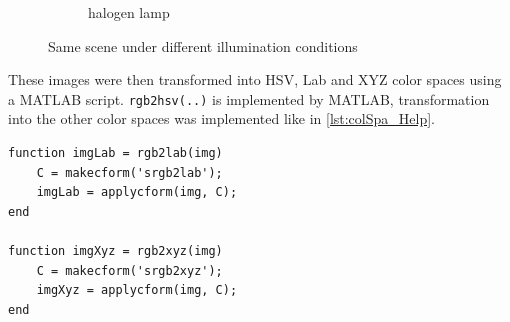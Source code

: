 \documentclass[
a4paper,     %
11pt         %
]{scrartcl}  %
\begin{document}
\begin{figure}[ht!]
\begin{subfigure}{.3\textwidth}
  \caption{halogen lamp}
\end{subfigure}
\caption{Same scene under different illumination conditions}
\label{fig:colSpa1}
\end{figure}

These images were then transformed into HSV, Lab and XYZ color spaces using a MATLAB script. \lstinline{rgb2hsv(..)} is implemented by MATLAB, transformation into the other color spaces was implemented like in \cref{lst:colSpa_Help}.

\begin{lstlisting}[label=lst:colSpa_Help, caption=Helper functions to convert from RGB to Lab and XYZ]
function imgLab = rgb2lab(img)
    C = makecform('srgb2lab');
    imgLab = applycform(img, C);
end

function imgXyz = rgb2xyz(img)
    C = makecform('srgb2xyz');
    imgXyz = applycform(img, C);
end
\end{lstlisting}
\end{document}
